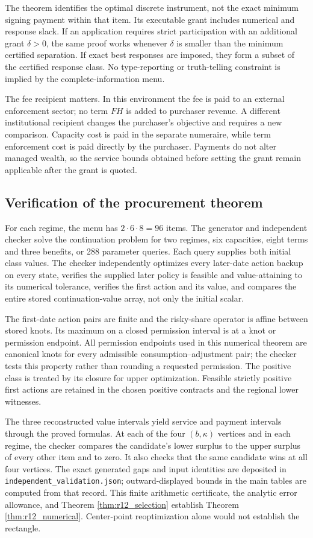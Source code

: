 The theorem identifies the optimal discrete instrument, not the exact minimum signing payment within that item. Its executable grant includes numerical and response slack. If an application requires strict participation with an additional grant $\delta>0$, the same proof works whenever $\delta$ is smaller than the minimum certified separation. If exact best responses are imposed, they form a subset of the certified response class. No type-reporting or truth-telling constraint is implied by the complete-information menu.

The fee recipient matters. In this environment the fee is paid to an external enforcement sector; no term $F H$ is added to purchaser revenue. A different institutional recipient changes the purchaser's objective and requires a new comparison. Capacity cost is paid in the separate numeraire, while term enforcement cost is paid directly by the purchaser. Payments do not alter managed wealth, so the service bounds obtained before setting the grant remain applicable after the grant is quoted.

\subsection{Verification of the procurement theorem}
For each regime, the menu has $2\cdot6\cdot8=96$ items. The generator and independent checker solve the continuation problem for two regimes, six capacities, eight terms and three benefits, or 288 parameter queries. Each query supplies both initial class values. The checker independently optimizes every later-date action backup on every state, verifies the supplied later policy is feasible and value-attaining to its numerical tolerance, verifies the first action and its value, and compares the entire stored continuation-value array, not only the initial scalar.

The first-date action pairs are finite and the risky-share operator is affine between stored knots. Its maximum on a closed permission interval is at a knot or permission endpoint. All permission endpoints used in this numerical theorem are canonical knots for every admissible consumption--adjustment pair; the checker tests this property rather than rounding a requested permission. The positive class is treated by its closure for upper optimization. Feasible strictly positive first actions are retained in the chosen positive contracts and the regional lower witnesses.

The three reconstructed value intervals yield service and payment intervals through the proved formulas. At each of the four $(b,\kappa)$ vertices and in each regime, the checker compares the candidate's lower surplus to the upper surplus of every other item and to zero. It also checks that the same candidate wins at all four vertices. The exact generated gaps and input identities are deposited in \texttt{independent\_validation.json}; outward-displayed bounds in the main tables are computed from that record. This finite arithmetic certificate, the analytic error allowance, and Theorem \ref{thm:r12_selection} establish Theorem \ref{thm:r12_numerical}. Center-point reoptimization alone would not establish the rectangle.


